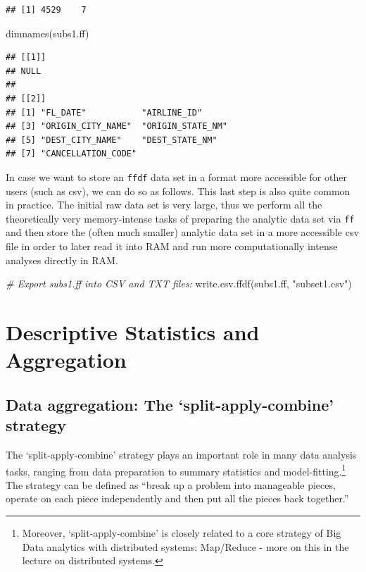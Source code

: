 \documentclass[
  12pt,
]{style/krantz}
\newenvironment{Shaded}{\begin{snugshade}}{\end{snugshade}}
\newcommand{\CommentTok}[1]{\textcolor[rgb]{0.56,0.35,0.01}{\textit{#1}}}
\newcommand{\FunctionTok}[1]{\textcolor[rgb]{0.00,0.00,0.00}{#1}}
\newcommand{\NormalTok}[1]{#1}
\newcommand{\StringTok}[1]{\textcolor[rgb]{0.31,0.60,0.02}{#1}}
\begin{document}
\begin{verbatim}
## [1] 4529    7
\end{verbatim}

\begin{Shaded}
\begin{Highlighting}[]
\FunctionTok{dimnames}\NormalTok{(subs1.ff)}
\end{Highlighting}
\end{Shaded}

\begin{verbatim}
## [[1]]
## NULL
## 
## [[2]]
## [1] "FL_DATE"           "AIRLINE_ID"       
## [3] "ORIGIN_CITY_NAME"  "ORIGIN_STATE_NM"  
## [5] "DEST_CITY_NAME"    "DEST_STATE_NM"    
## [7] "CANCELLATION_CODE"
\end{verbatim}

In case we want to store an \texttt{ffdf} data set in a format more accessible for other users (such as csv), we can do so as follows. This last step is also quite common in practice. The initial raw data set is very large, thus we perform all the theoretically very memory-intense tasks of preparing the analytic data set via \texttt{ff} and then store the (often much smaller) analytic data set in a more accessible csv file in order to later read it into RAM and run more computationally intense analyses directly in RAM.

\begin{Shaded}
\begin{Highlighting}[]
\CommentTok{\#  Export subs1.ff into CSV and TXT files:}
\FunctionTok{write.csv.ffdf}\NormalTok{(subs1.ff, }\StringTok{"subset1.csv"}\NormalTok{)}
\end{Highlighting}
\end{Shaded}

\hypertarget{descriptive-statistics-and-aggregation}{%
\chapter{Descriptive Statistics and Aggregation}\label{descriptive-statistics-and-aggregation}}

\hypertarget{data-aggregation-the-split-apply-combine-strategy}{%
\section{Data aggregation: The `split-apply-combine' strategy}\label{data-aggregation-the-split-apply-combine-strategy}}

The `split-apply-combine' strategy plays an important role in many data analysis tasks, ranging from data preparation to summary statistics and model-fitting.\footnote{Moreover, `split-apply-combine' is closely related to a core strategy of Big Data analytics with distributed systems: Map/Reduce - more on this in the lecture on distributed systems.} The strategy can be defined as ``break up a problem into manageable pieces, operate on each piece independently and then put all the pieces back together.'' \citep[p.~1]{wickham_2011}
\end{document}
